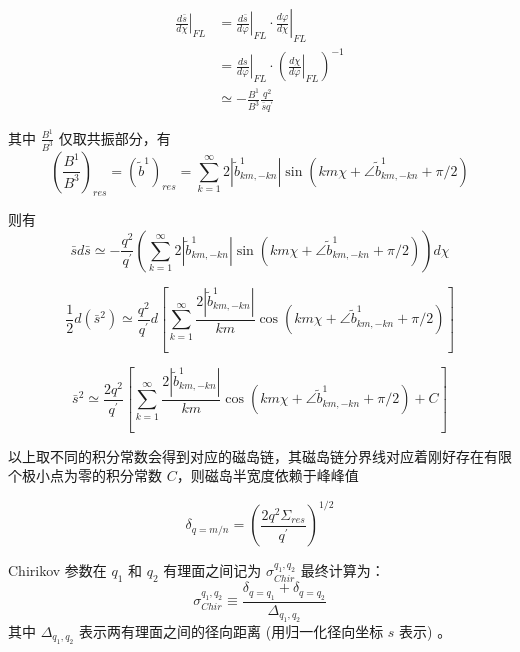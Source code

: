   \begin{equation}\begin{aligned}
    \left.\frac{d \bar{s}}{d \chi}\right|_{F L} &=\left.\left.\frac{d \bar{s}}{d \varphi}\right|_{F L} \cdot \frac{d \varphi}{d \chi}\right|_{F L} \\
    &=\left.\frac{d s}{d \varphi}\right|_{F L} \cdot\left(\left.\frac{d \chi}{d \varphi}\right|_{F L}\right)^{-1} \\
    & \simeq-\frac{B^{1}}{B^{3}} \frac{q^{2}}{\bar{s} q^{\prime}}
    \end{aligned}\end{equation}

其中 $\frac{B^{1}}{B^{3}}$ 仅取共振部分，有
    $$\left(\frac{B^{1}}{B^{3}}\right)_{r e s}= \left(\tilde{b}^1\right)_{r e s}=\sum_{k=1}^{\infty}  2\left|\tilde{b}_{km,-kn}^{1}\right| \sin \left(km\chi + \angle\tilde{b}_{km,-kn}^{1} + \pi/2 \right)$$

则有
\begin{equation}
  \bar{s} d \bar{s} \simeq-\frac{q^{2} }{q^{\prime}} \left( \sum_{k=1}^{\infty}  2\left|\tilde{b}_{km,-kn}^{1}\right| \sin \left(km\chi + \angle\tilde{b}_{km,-kn}^{1} + \pi/2 \right)\right)d \chi 
\end{equation}

\begin{equation}
  \frac{1}{2} d\left(\bar{s}^{2}\right) \simeq \frac{q^{2}}{q^{\prime} } d[\sum_{k=1}^{\infty} \frac{2\left|\tilde{b}_{km,-kn}^{1}\right|}{k m}  \cos \left(km\chi + \angle\tilde{b}_{km,-kn}^{1} + \pi/2 \right)]
\end{equation}


\begin{equation}\bar{s}^{2} \simeq \frac{2 q^{2} }{q^{\prime} }[\sum_{k=1}^{\infty} \frac{2\left|\tilde{b}_{km,-kn}^{1}\right|}{k m}  \cos \left(km\chi + \angle\tilde{b}_{km,-kn}^{1} + \pi/2 \right) + C]\end{equation}

以上取不同的积分常数会得到对应的磁岛链，其磁岛链分界线对应着刚好存在有限个极小点为零的积分常数 $C$，则磁岛半宽度依赖于峰峰值

\begin{equation}
  \delta_{q=m / n}=\left(\frac{2 q^{2} \Sigma_{res}}{q^{\prime} }\right)^{1 / 2}
\end{equation}

Chirikov 参数在 $q_1$ 和 $q_2$ 有理面之间记为 $\sigma_{C h i r}^{q_1, q_2}$ 最终计算为：
\[
\sigma_{C h i r}^{q_1, q_2} \equiv \frac{\delta_{q=q_1}+\delta_{q=q_2}}{\Delta_{q_1, q_2}}
\]
其中 $\Delta_{q_1, q_2}$ 表示两有理面之间的径向距离 (用归一化径向坐标 $s$ 表示) 。


